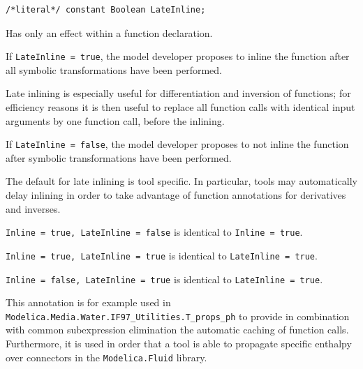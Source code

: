 \begin{annotationdefinition}[LateInline]
\begin{synopsis}\begin{lstlisting}
/*literal*/ constant Boolean LateInline;
\end{lstlisting}\end{synopsis}
\begin{semantics}
Has only an effect within a function declaration.

If {\lstinline!LateInline = true!}, the model developer proposes to inline the function after all symbolic transformations have been performed.

\begin{nonnormative}
Late inlining is especially useful for differentiation and inversion of functions; for efficiency reasons it is then useful to replace all function calls with identical input arguments by one function call, before the inlining.
\end{nonnormative}

If {\lstinline!LateInline = false!}, the model developer proposes to not inline the function after symbolic transformations have been performed.

The default for late inlining is tool specific.
In particular, tools may automatically delay inlining in order to take advantage of function annotations for derivatives and inverses.

{\lstinline!Inline = true, LateInline = false!} is identical to {\lstinline!Inline = true!}.

{\lstinline!Inline = true, LateInline = true!} is identical to {\lstinline!LateInline = true!}.

{\lstinline!Inline = false, LateInline = true!} is identical to {\lstinline!LateInline = true!}.

\begin{nonnormative}
This annotation is for example used in {\lstinline!Modelica.Media.Water.IF97_Utilities.T_props_ph!} to provide in combination with common subexpression elimination the automatic caching of function calls.
Furthermore, it is used in order that a tool is able to propagate specific enthalpy over connectors in the {\lstinline!Modelica.Fluid!} library.
\end{nonnormative}
\end{semantics}
\end{annotationdefinition}

